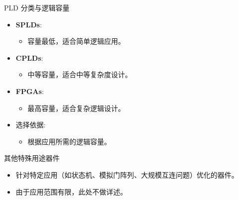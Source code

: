 \documentclass[
  ignorenonframetext,
  chinese,
]{beamer}
\providecommand{\tightlist}{%
  \setlength{\itemsep}{0pt}\setlength{\parskip}{0pt}}
\begin{document}
\begin{frame}
\begin{block}{PLD 分类与逻辑容量}
\label{pld-ux5206ux7c7bux4e0eux903bux8f91ux5bb9ux91cf}
\begin{itemize}
\tightlist
\item
  \textbf{SPLDs}:

  \begin{itemize}
  \tightlist
  \item
    容量最低，适合简单逻辑应用。
  \end{itemize}
\item
  \textbf{CPLDs}:

  \begin{itemize}
  \tightlist
  \item
    中等容量，适合中等复杂度设计。
  \end{itemize}
\item
  \textbf{FPGAs}:

  \begin{itemize}
  \tightlist
  \item
    最高容量，适合复杂逻辑设计。
  \end{itemize}
\item
  选择依据:

  \begin{itemize}
  \tightlist
  \item
    根据应用所需的逻辑容量。
  \end{itemize}
\end{itemize}
\end{block}
\end{frame}

\begin{frame}
\begin{block}{其他特殊用途器件}
\label{ux5176ux4ed6ux7279ux6b8aux7528ux9014ux5668ux4ef6}
\begin{itemize}
\tightlist
\item
  针对特定应用（如状态机、模拟门阵列、大规模互连问题）优化的器件。
\item
  由于应用范围有限，此处不做详述。
\end{itemize}
\end{block}
\end{frame}
\end{document}

